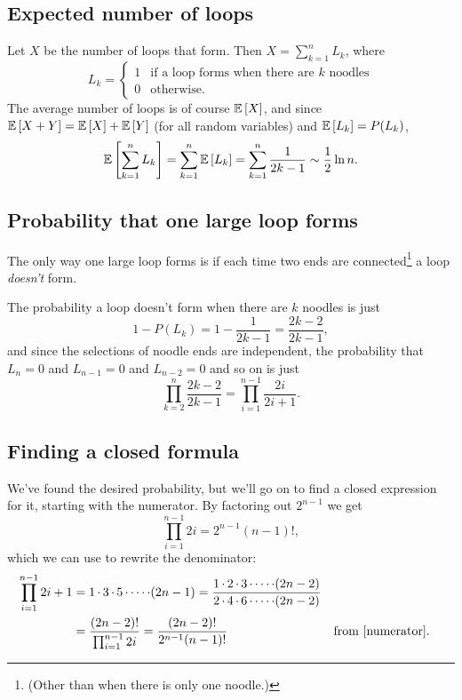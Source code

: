 \documentclass{book}
\begin{document}
\subsection*{Expected number of loops}
Let $X$ be the number of loops that form. Then $X = \sum_{k=1}^{n} L_k$, where
\begin{equation*}
L_k = \begin{cases}
  1 &\text{if a loop forms when there are $k$ noodles}\\
  0 &\text{otherwise}.
  \end{cases}
\end{equation*}
The average number of loops is of course $\mathbb{E}\left[X\right]$, and since $\mathbb{E}\left[X + Y\right] = \mathbb{E}\left[X\right]+\mathbb{E}\left[Y\right]$ (for all random variables) and
$\mathbb{E}\left[L_k\right] = P(L_k)$,
\[
\mathbb{E}\left[\sum_{k=1}^n L_k\right] = \sum_{k=1}^n \mathbb{E}\left[L_k\right] = \sum_{k=1}^n \frac{1}{2k-1} \sim \frac{1}{2}\ln n.
\]

\subsection*{Probability that one large loop forms}
The only way one large loop forms is if each time two
ends are connected\footnote{(Other than when there is only one noodle.)} a loop \textit{doesn't} form.

The probability a loop doesn't form when there are $k$ noodles is just
\[
1-P(L_k)=1-\frac{1}{2k-1}=\frac{2k-2}{2k-1},
\]
and since the selections
of noodle ends are independent, the probability that $L_n = 0$ and $L_{n-1} = 0$ and $L_{n-2} = 0$ and so on is just
\[
\prod_{k=2}^{n}\frac{2k-2}{2k-1} = \prod_{i=1}^{n-1}\frac{2i}{2i+1}.
\]

\subsection*{Finding a closed formula}
We've found the desired probability, but we'll go on to find a closed expression for it, starting with the numerator. By factoring out $2^{n-1}$ we get
\begin{equation}\label{numerator}
\prod_{i=1}^{n-1}2i = 2^{n-1}(n-1)!,
\end{equation}
which we can use to rewrite the denominator:
\begin{align*}
  \prod_{i=1}^{n-1}2i+1 
  &= 1\cdot3\cdot5\cdot\cdots\cdot(2n-1)
  = \frac{1\cdot2\cdot3\cdot\cdots\cdot(2n-2)}{2\cdot4\cdot6\cdot\cdots\cdot(2n-2)}\\
  &= \frac{(2n-2)!}{\prod_{i=1}^{n-1}2i}
  = \frac{(2n-2)!}{2^{n-1}(n-1)!} && \text{from \eqref{numerator}.}
\end{align*}
\end{document}
